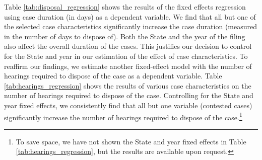 \documentclass[12pt,a4paper]{article}
\begin{document}
Table \ref{tab:disposal_regression} shows the results of the fixed effects regression using case duration (in days) as a dependent variable. We find that all but one of the selected case characteristics significantly increase the case duration (measured in the number of days to dispose of). Both the State and the year of the filing also affect the overall duration of the cases. This justifies our decision to control for the State and year in our estimation of the effect of case characteristics. To reaffirm our findings, we estimate another fixed-effect model with the number of hearings required to dispose of the case as a dependent variable. Table \ref{tab:hearings_regression} shows the results of various case characteristics on the number of hearings required to dispose of the case. Controlling for the State and year fixed effects, we consistently find that all but one variable (contested cases) significantly increase the number of hearings required to dispose of the case.\footnote{To save space, we have not shown the State and year fixed effects in Table \ref{tab:hearings_regression}, but the results are available upon request.}
\end{document}
